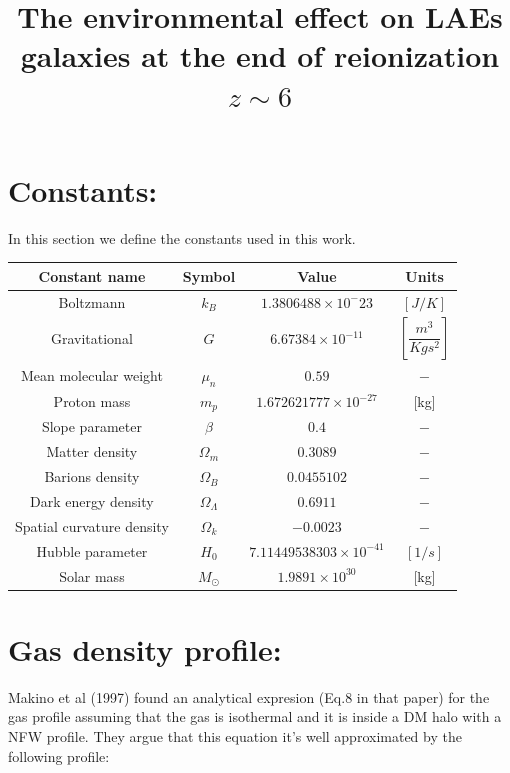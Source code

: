 \documentclass[12pt]{article}
\title{\begin{LARGE}
{The environmental effect on LAEs galaxies at the end of reionization $z\sim 6$}
\end{LARGE}}
\begin{document}
\maketitle

\section{Constants:}

In this section we define the constants used in this work.

\begin{table}[H]
\begin{center}
\begin{tabular}{c c c c}
\hline
Constant name & Symbol & Value & Units \\
\hline
\hline
Boltzmann  & $k_B$ & $1.3806488\times 10^-{23}$ & $[J/K]$ \\ 
Gravitational & $G$ & $6.67384\times 10^{-11}$ & $[\dfrac{m^3}{Kgs^2}]$\\
Mean molecular weight &$\mu_n$ & $0.59$ & $-$ \\
Proton mass & $m_p$ & $1.672621777\times 10^{-27}$ & [kg] \\
Slope parameter & $\beta$ & $0.4$ & $-$ \\
Matter density & $\Omega_m$ & $0.3089$ & $-$ \\ 
Barions density & $\Omega_B$ & $ 0.0455102$ & $-$ \\
Dark energy density & $\Omega_{\Lambda}$ & $0.6911$ & $-$ \\
Spatial curvature density& $\Omega_{k} $ & $-0.0023$ & $-$ \\
Hubble parameter & $H_0$ & $7.11449538303\times 10^{-41}$& $[1/s]$ \\
Solar mass &  $M_{\odot} $ & $1.9891\times 10^{30}$  & [kg] \\ 
\hline
\end{tabular}
\end{center}
\end{table}

\section{Gas density profile:}\label{sec:rho}

Makino et al (1997) found an analytical expresion (Eq.8 in that paper) for the gas profile assuming that the gas
is isothermal and it is inside a DM halo with a NFW profile. They argue that this equation it's well approximated by 
the following profile:
\end{document}

